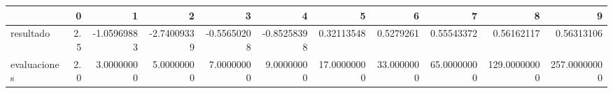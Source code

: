 \begin{tabular}{lrrrrrrrrrr}
\toprule
{} &    0 &           1 &           2 &           3 &           4 &            5 &           6 &            7 &             8 &             9 \\
\midrule
resultado    &  2.5 & -1.05969883 & -2.74009339 & -0.55650208 & -0.85258398 &   0.32113548 &   0.5279261 &   0.55543372 &    0.56162117 &    0.56313106 \\
evaluaciones &  2.0 &  3.00000000 &  5.00000000 &  7.00000000 &  9.00000000 &  17.00000000 &  33.0000000 &  65.00000000 &  129.00000000 &  257.00000000 \\
\bottomrule
\end{tabular}
